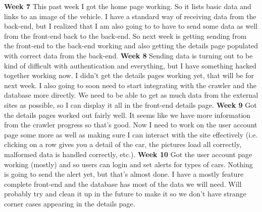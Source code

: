 \documentclass[onecolumn, draftclsnofoot, 10pt, compsoc]{IEEEtran}
\begin{document}
\newline
\textbf{Week 7}
This past week I got the home page working. So it lists basic data and links to an image of the vehicle. I have a standard way of receiving data from the back-end, but I realized that I am also going to to have to send some data as well from the front-end back to the back-end. So next week is getting sending from the front-end to the back-end working and also getting the details page populated with correct data from the back-end.
\newline
\textbf{Week 8}
Sending data is turning out to be kind of difficult with authentication and everything, but I have something hacked together working now. I didn't get the details pages working yet, that will be for next week. I also going to soon need to start integrating with the crawler and the database more directly. We need to be able to get as much data from the external sites as possible, so I can display it all in the front-end details page.
\newline
\textbf{Week 9}
Got the details pages worked out fairly well. It seems like we have more information from the crawler progress so that's good. Now I need to work on the user account page some more as well as making sure I can interact with the site effectively (i.e. clicking on a row gives you a detail of the car, the pictures load all correctly, malformed data is handled correctly, etc.).
\newline
\textbf{Week 10}
Got the user account page working (mostly) and so users can login and set alerts for types of cars. Nothing is going to send the alert yet, but that's almost done. I have a mostly feature complete front-end and the database has most of the data we will need. Will probably try and clean it up in the future to make it so we don't have strange corner cases appearing in the details page.
\end{document}
